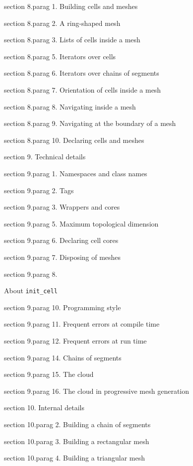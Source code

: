 \numb section 8.\numb parag 1. Building cells and meshes

\numb section 8.\numb parag 2. A ring-shaped mesh

\numb section 8.\numb parag 3. Lists of cells inside a mesh

\numb section 8.\numb parag 5. Iterators over cells

\numb section 8.\numb parag 6. Iterators over chains of segments

\numb section 8.\numb parag 7. Orientation of cells inside a mesh

\numb section 8.\numb parag 8. Navigating inside a mesh

\numb section 8.\numb parag 9. Navigating at the boundary of a mesh

\numb section 8.\numb parag 10. Declaring cells and meshes


\medskip\noindent
\numb section 9. Technical details

\numb section 9.\numb parag 1. Namespaces and class names

\numb section 9.\numb parag 2. Tags

\numb section 9.\numb parag 3. Wrappers and cores

\numb section 9.\numb parag 5. Maximum topological dimension

\numb section 9.\numb parag 6. Declaring cell cores

\numb section 9.\numb parag 7. Disposing of meshes

\numb section 9.\numb parag 8.
About {\tt init\_cell}

\numb section 9.\numb parag 10. Programming style

\numb section 9.\numb parag 11. Frequent errors at compile time

\numb section 9.\numb parag 12. Frequent errors at run time

\numb section 9.\numb parag 14. Chains of segments

\numb section 9.\numb parag 15. The cloud

\numb section 9.\numb parag 16. The cloud in progressive mesh generation


\medskip\noindent
\numb section 10. Internal details

\numb section 10.\numb parag 2. Building a chain of segments

\numb section 10.\numb parag 3. Building a rectangular mesh

\numb section 10.\numb parag 4. Building a triangular mesh

